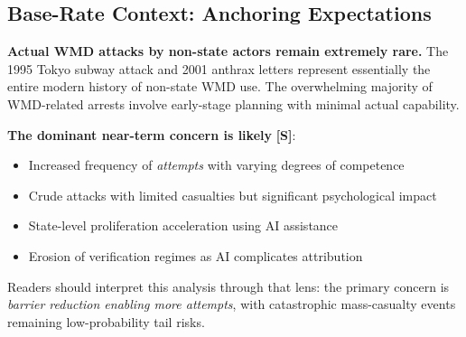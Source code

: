 \documentclass[11pt,letterpaper]{article}
\begin{document}
\begin{center}

\end{center}

\subsection*{Base-Rate Context: Anchoring Expectations}

\begin{quotebox}
\textbf{Actual WMD attacks by non-state actors remain extremely rare.} The 1995 Tokyo subway attack and 2001 anthrax letters represent essentially the entire modern history of non-state WMD use. The overwhelming majority of WMD-related arrests involve early-stage planning with minimal actual capability.

\textbf{The dominant near-term concern is likely} \textbf{[S]}:
\begin{itemize}[nosep]
  \item Increased frequency of \textit{attempts} with varying degrees of competence
  \item Crude attacks with limited casualties but significant psychological impact
  \item State-level proliferation acceleration using AI assistance
  \item Erosion of verification regimes as AI complicates attribution
\end{itemize}

Readers should interpret this analysis through that lens: the primary concern is \textit{barrier reduction enabling more attempts}, with catastrophic mass-casualty events remaining low-probability tail risks.
\end{quotebox}
\end{document}
